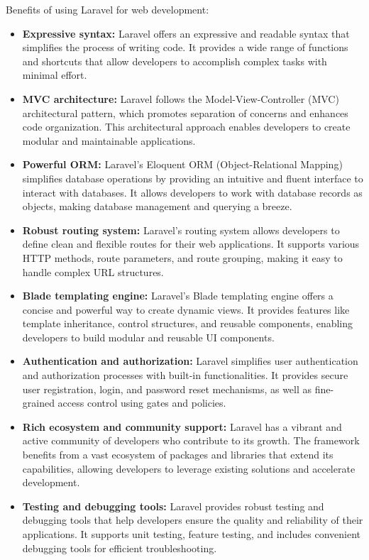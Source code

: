 \medskip Benefits of using Laravel for web development:
\begin{itemize}

\item \textbf{Expressive syntax: }Laravel offers an expressive and readable syntax that simplifies the process of writing code. It provides a wide range of functions and shortcuts that allow developers to accomplish complex tasks with minimal effort.

\item \textbf{MVC architecture: }Laravel follows the Model-View-Controller (MVC) architectural pattern, which promotes separation of concerns and enhances code organization. This architectural approach enables developers to create modular and maintainable applications.

\item \textbf{Powerful ORM: }Laravel's Eloquent ORM (Object-Relational Mapping) simplifies database operations by providing an intuitive and fluent interface to interact with databases. It allows developers to work with database records as objects, making database management and querying a breeze.

\item \textbf{Robust routing system: }Laravel's routing system allows developers to define clean and flexible routes for their web applications. It supports various HTTP methods, route parameters, and route grouping, making it easy to handle complex URL structures.

\item \textbf{Blade templating engine: }Laravel's Blade templating engine offers a concise and powerful way to create dynamic views. It provides features like template inheritance, control structures, and reusable components, enabling developers to build modular and reusable UI components.

\item \textbf{Authentication and authorization: }Laravel simplifies user authentication and authorization processes with built-in functionalities. It provides secure user registration, login, and password reset mechanisms, as well as fine-grained access control using gates and policies.

\item \textbf{Rich ecosystem and community support: }Laravel has a vibrant and active community of developers who contribute to its growth. The framework benefits from a vast ecosystem of packages and libraries that extend its capabilities, allowing developers to leverage existing solutions and accelerate development.

\item \textbf{Testing and debugging tools: }Laravel provides robust testing and debugging tools that help developers ensure the quality and reliability of their applications. It supports unit testing, feature testing, and includes convenient debugging tools for efficient troubleshooting.
\end{itemize}

